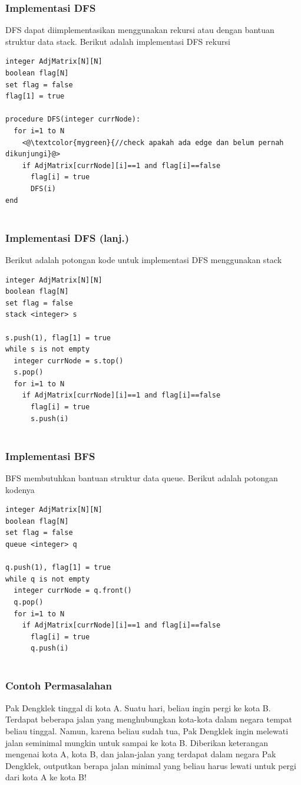 \begin{frame}[fragile]
\frametitle{Implementasi DFS}
DFS dapat diimplementasikan menggunakan rekursi atau dengan bantuan struktur data stack. Berikut adalah implementasi DFS rekursi\newline
\begin{lstlisting}
integer AdjMatrix[N][N]
boolean flag[N]
set flag = false
flag[1] = true

procedure DFS(integer currNode):
  for i=1 to N
    <@\textcolor{mygreen}{//check apakah ada edge dan belum pernah dikunjungi}@>
    if AdjMatrix[currNode][i]==1 and flag[i]==false
      flag[i] = true
      DFS(i)
end
				
\end{lstlisting}
\end{frame}

\begin{frame}[fragile]
\frametitle{Implementasi DFS (lanj.)}
Berikut adalah potongan kode untuk implementasi DFS menggunakan stack\newline
\begin{lstlisting}
integer AdjMatrix[N][N]
boolean flag[N]
set flag = false
stack <integer> s

s.push(1), flag[1] = true
while s is not empty
  integer currNode = s.top()
  s.pop()
  for i=1 to N
    if AdjMatrix[currNode][i]==1 and flag[i]==false
      flag[i] = true
      s.push(i)
				
\end{lstlisting}
\end{frame}

\begin{frame}[fragile]
\frametitle{Implementasi BFS}
BFS membutuhkan bantuan struktur data queue. Berikut adalah potongan kodenya\newline
\begin{lstlisting}
integer AdjMatrix[N][N]
boolean flag[N]
set flag = false
queue <integer> q

q.push(1), flag[1] = true
while q is not empty
  integer currNode = q.front()
  q.pop()
  for i=1 to N
    if AdjMatrix[currNode][i]==1 and flag[i]==false
      flag[i] = true
      q.push(i)
				
\end{lstlisting}
\end{frame}

\begin{frame}
\frametitle{Contoh Permasalahan}
Pak Dengklek tinggal di kota A. Suatu hari, beliau ingin pergi ke kota B. Terdapat beberapa jalan yang menghubungkan kota-kota dalam negara tempat beliau tinggal. Namun, karena beliau sudah tua, Pak Dengklek ingin melewati jalan seminimal mungkin untuk sampai ke kota B.
\newline\newline
Diberikan keterangan mengenai kota A, kota B, dan jalan-jalan yang terdapat dalam negara Pak Dengklek, outputkan berapa jalan minimal yang beliau harus lewati untuk pergi dari kota A ke kota B!
\end{frame}

